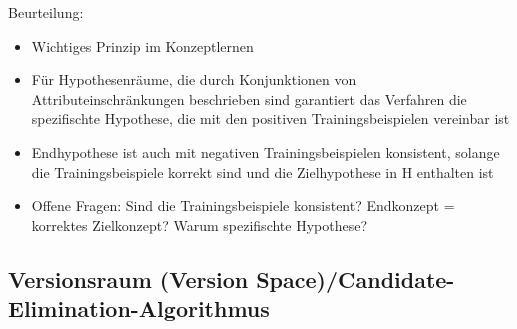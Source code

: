 \documentclass[paper=a4, fontsize=11pt]{scrartcl} %
\numberwithin{equation}{section} %
\numberwithin{figure}{section} %
\numberwithin{table}{section} %
\begin{document}
Beurteilung:
\begin{itemize}
\item Wichtiges Prinzip im Konzeptlernen
\item Für Hypothesenräume, die durch Konjunktionen von Attributeinschränkungen beschrieben sind garantiert das Verfahren die spezifischte Hypothese, die mit den positiven Trainingsbeispielen vereinbar ist
\item Endhypothese ist auch mit negativen Trainingsbeispielen konsistent, solange die Trainingsbeispiele korrekt sind und die Zielhypothese in H enthalten ist
\item Offene Fragen: Sind die Trainingsbeispiele konsistent? Endkonzept = korrektes Zielkonzept? Warum spezifischte Hypothese?
\end{itemize}

\subsection{Versionsraum (Version Space)/Candidate-Elimination-Algorithmus}
\end{document}
